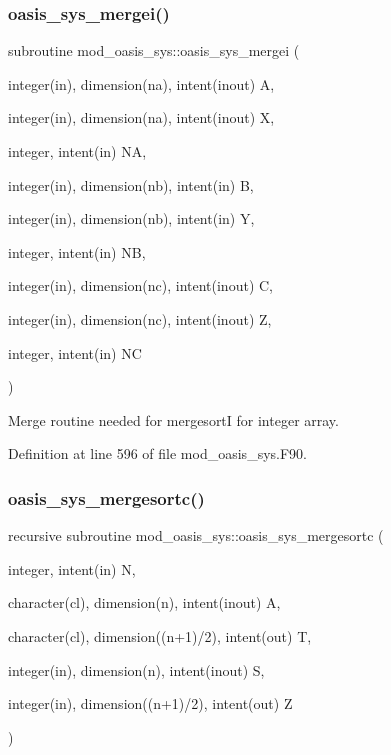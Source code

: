 \subsubsection{\texorpdfstring{oasis\+\_\+sys\+\_\+mergei()}{oasis\_sys\_mergei()}}
{\footnotesize\ttfamily subroutine mod\+\_\+oasis\+\_\+sys\+::oasis\+\_\+sys\+\_\+mergei (\begin{DoxyParamCaption}\item[{integer(in), dimension(na), intent(inout)}]{A,  }\item[{integer(in), dimension(na), intent(inout)}]{X,  }\item[{integer, intent(in)}]{NA,  }\item[{integer(in), dimension(nb), intent(in)}]{B,  }\item[{integer(in), dimension(nb), intent(in)}]{Y,  }\item[{integer, intent(in)}]{NB,  }\item[{integer(in), dimension(nc), intent(inout)}]{C,  }\item[{integer(in), dimension(nc), intent(inout)}]{Z,  }\item[{integer, intent(in)}]{NC }\end{DoxyParamCaption})\hspace{0.3cm}{\ttfamily [private]}}



Merge routine needed for mergesortI for integer array. 



Definition at line 596 of file mod\+\_\+oasis\+\_\+sys.\+F90.

\mbox{\label{namespacemod__oasis__sys_a30b91b7cab02c85d85fb7a7debdd5ec2}} 
\subsubsection{\texorpdfstring{oasis\+\_\+sys\+\_\+mergesortc()}{oasis\_sys\_mergesortc()}}
{\footnotesize\ttfamily recursive subroutine mod\+\_\+oasis\+\_\+sys\+::oasis\+\_\+sys\+\_\+mergesortc (\begin{DoxyParamCaption}\item[{integer, intent(in)}]{N,  }\item[{character(cl), dimension(n), intent(inout)}]{A,  }\item[{character(cl), dimension((n+1)/2), intent(out)}]{T,  }\item[{integer(in), dimension(n), intent(inout)}]{S,  }\item[{integer(in), dimension((n+1)/2), intent(out)}]{Z }\end{DoxyParamCaption})\hspace{0.3cm}{\ttfamily [private]}}



